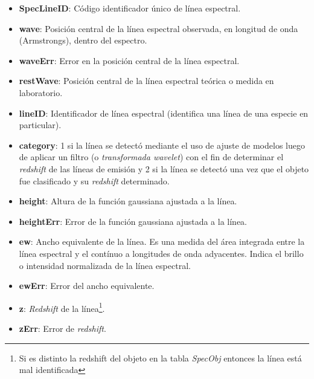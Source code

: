 \begin{itemize}
\item \textbf{SpecLineID}: Código identificador único de línea espectral.
\item \textbf{wave}: Posición central de la línea espectral observada, en longitud de onda (Armstrongs), dentro del espectro.
\item \textbf{waveErr}: Error en la posición central de la línea espectral.
\item \textbf{restWave}: Posición central de la línea espectral teórica o medida en laboratorio.
\item \textbf{lineID}: Identificador de línea espectral (identifica una línea de una especie en particular).
\item \textbf{category}: 1 si la línea se detectó mediante el uso de ajuste de modelos luego de aplicar un filtro (o \textit{transformada wavelet}) con el fin de determinar el \textit{redshift} de las líneas de emisión y 2 si la línea se detectó una vez que el objeto fue clasificado y su \textit{redshift} determinado.
\item \textbf{height}: Altura de la función gaussiana ajustada a la línea.
\item \textbf{heightErr}: Error de la función gaussiana ajustada a la línea.
\item \textbf{ew}: Ancho equivalente de la línea. Es una medida del área integrada entre la línea espectral y el contínuo a longitudes de onda adyacentes. Indica el brillo o intensidad normalizada de la línea espectral.
\item \textbf{ewErr}: Error del ancho equivalente.
\item \textbf{z}: \textit{Redshift} de la línea\footnote{Si es distinto la redshift del objeto en la tabla \textit{SpecObj} entonces la línea está mal identificada}.
\item \textbf{zErr}: Error de \textit{redshift}.
\end{itemize}

